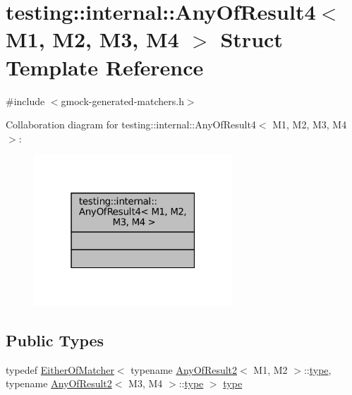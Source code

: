 \hypertarget{structtesting_1_1internal_1_1AnyOfResult4}{}\section{testing\+:\+:internal\+:\+:Any\+Of\+Result4$<$ M1, M2, M3, M4 $>$ Struct Template Reference}
\label{structtesting_1_1internal_1_1AnyOfResult4}


{\ttfamily \#include $<$gmock-\/generated-\/matchers.\+h$>$}



Collaboration diagram for testing\+:\+:internal\+:\+:Any\+Of\+Result4$<$ M1, M2, M3, M4 $>$\+:
\nopagebreak
\begin{figure}[H]
\begin{center}
\leavevmode
\includegraphics[width=211pt]{structtesting_1_1internal_1_1AnyOfResult4__coll__graph}
\end{center}
\end{figure}
\subsection*{Public Types}
\begin{DoxyCompactItemize}
\item 
typedef \hyperlink{classtesting_1_1internal_1_1EitherOfMatcher}{Either\+Of\+Matcher}$<$ typename \hyperlink{structtesting_1_1internal_1_1AnyOfResult2}{Any\+Of\+Result2}$<$ M1, M2 $>$\+::\hyperlink{structtesting_1_1internal_1_1AnyOfResult4_a4f3c9aebb4f7fc24287b59a0bdf1a4a6}{type}, typename \hyperlink{structtesting_1_1internal_1_1AnyOfResult2}{Any\+Of\+Result2}$<$ M3, M4 $>$\+::\hyperlink{structtesting_1_1internal_1_1AnyOfResult4_a4f3c9aebb4f7fc24287b59a0bdf1a4a6}{type} $>$ \hyperlink{structtesting_1_1internal_1_1AnyOfResult4_a4f3c9aebb4f7fc24287b59a0bdf1a4a6}{type}
\end{DoxyCompactItemize}


